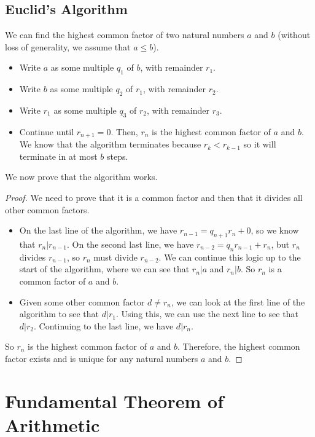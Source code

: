 \documentclass{article}
\begin{document}
	\subsection{Euclid's Algorithm}
	We can find the highest common factor of two natural numbers $a$ and $b$ (without loss of generality, we assume that $a \leq b$).
	\begin{itemize}
		\item Write $a$ as some multiple $q_1$ of $b$, with remainder $r_1$.
		\item Write $b$ as some multiple $q_2$ of $r_1$, with remainder $r_2$.
		\item Write $r_1$ as some multiple $q_3$ of $r_2$, with remainder $r_3$.
		\item Continue until $r_{n+1}=0$. Then, $r_n$ is the highest common factor of $a$ and $b$. We know that the algorithm terminates because $r_k < r_{k-1}$ so it will terminate in at most $b$ steps.
	\end{itemize}
	We now prove that the algorithm works.
	\begin{proof}
		We need to prove that it is a common factor and then that it divides all other common factors.
		\begin{itemize}
			\item On the last line of the algorithm, we have $r_{n-1} = q_{n+1} r_n + 0$, so we know that $r_n | r_{n-1}$. On the second last line, we have $r_{n-2} = q_n r_{n-1} + r_n$, but $r_n$ divides $r_{n-1}$, so $r_n$ must divide $r_{n-2}$. We can continue this logic up to the start of the algorithm, where we can see that $r_n | a$ and $r_n | b$. So $r_n$ is a common factor of $a$ and $b$.
			\item Given some other common factor $d \neq r_n$, we can look at the first line of the algorithm to see that $d | r_1$. Using this, we can use the next line to see that $d | r_2$. Continuing to the last line, we have $d | r_n$.
		\end{itemize}
		So $r_n$ is the highest common factor of $a$ and $b$. Therefore, the highest common factor exists and is unique for any natural numbers $a$ and $b$.
	\end{proof}

	\section{Fundamental Theorem of Arithmetic}
\end{document}

